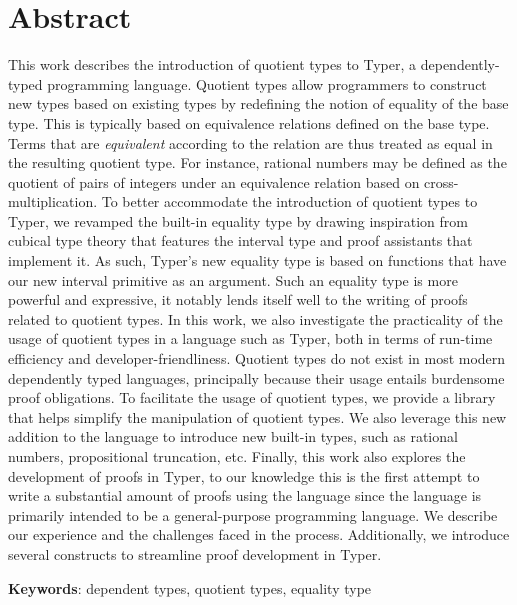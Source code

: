 \documentclass[12pt,twoside,maitrise]{dms}
\theoremstyle{definition}
\numberwithin{equation}{section}
\numberwithin{table}{chapter}
\numberwithin{figure}{chapter}
\begin{document}
\anglais
\chapter*{Abstract}

This work describes the introduction of quotient types to
Typer\cite{monnier2019typer}, a dependently-typed programming language. Quotient
types allow programmers to construct new types based on existing types by
redefining the notion of equality of the base type. This is typically based on
equivalence relations defined on the base type. Terms that are \emph{equivalent}
according to the relation are thus treated as equal in the resulting quotient
type. For instance, rational numbers may be defined as the quotient of pairs of
integers under an equivalence relation based on cross-multiplication. To better
accommodate the introduction of quotient types to Typer, we revamped the
built-in equality type by drawing inspiration from cubical type theory that
features the interval type and proof assistants that implement it. As such,
Typer's new equality type is based on functions that have our new interval
primitive as an argument. Such an equality type is more powerful and expressive,
it notably lends itself well to the writing of proofs related to quotient types.
In this work, we also investigate the practicality of the usage of quotient
types in a language such as Typer, both in terms of run-time efficiency and
developer-friendliness. Quotient types do not exist in most modern dependently
typed languages, principally because their usage entails burdensome proof
obligations. To facilitate the usage of quotient types, we provide a library
that helps simplify the manipulation of quotient types. We also leverage this
new addition to the language to introduce new built-in types, such as rational
numbers, propositional truncation, etc. Finally, this work also explores the
development of proofs in Typer, to our knowledge this is the first attempt to
write a substantial amount of proofs using the language since the language is
primarily intended to be a general-purpose programming language. We describe our
experience and the challenges faced in the process. Additionally, we introduce
several constructs to streamline proof development in Typer.

\textbf{Keywords}: dependent types, quotient types, equality type

\end{document}
